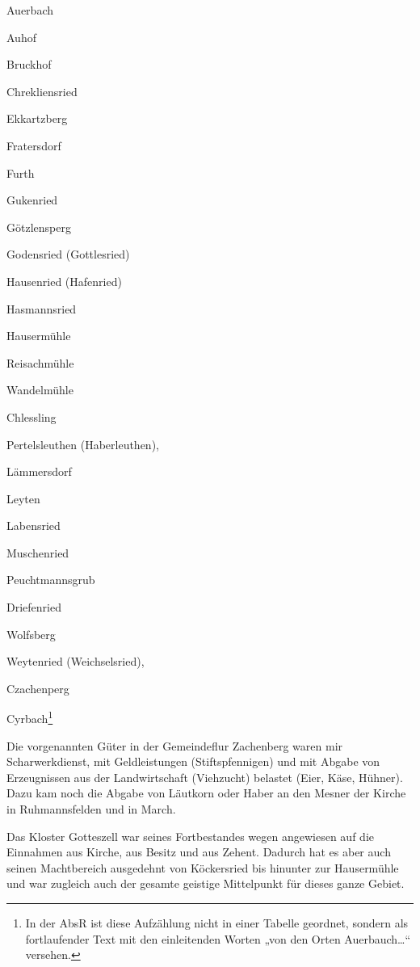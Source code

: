 \documentclass{book}
\begin{document}
\begin{compactitem}
\item Auerbach
\item Auhof
\item Bruckhof
\item Chrekliensried
\item Ekkartzberg
\item Fratersdorf
\item Furth
\item Gukenried
\item Götzlensperg
\item Godensried (Gottlesried)
\item Hausenried (Hafenried)
\item Hasmannsried
\item Hausermühle
\item Reisachmühle
\item Wandelmühle
\item Chlessling
\item Pertelsleuthen (Haberleuthen),
\item Lämmersdorf
\item Leyten
\item Labensried
\item Muschenried
\item Peuchtmannsgrub
\item Driefenried
\item Wolfsberg
\item Weytenried (Weichselsried),
\item Czachenperg
\item Cyrbach\footnote{In der AbsR ist diese Aufzählung nicht in einer
Tabelle geordnet, sondern als fortlaufender Text mit den einleitenden
Worten „von den Orten Auerbauch…“ versehen.}
\end{compactitem}

Die vorgenannten Güter in der Gemeindeflur Zachenberg waren mir
Scharwerkdienst, mit Geldleistungen (Stiftspfennigen) und mit Abgabe von
Erzeugnissen aus der Landwirtschaft (Viehzucht) belastet (Eier, Käse,
Hühner). Dazu kam noch die Abgabe von Läutkorn oder Haber an den Mesner
der Kirche in Ruhmannsfelden und in March.

Das Kloster Gotteszell war seines Fortbestandes wegen angewiesen auf die
Einnahmen aus Kirche, aus Besitz und aus Zehent. Dadurch hat es aber
auch seinen Machtbereich ausgedehnt von Köckersried bis hinunter zur
Hausermühle und war zugleich auch der gesamte geistige Mittelpunkt für
dieses ganze Gebiet.
\end{document}
